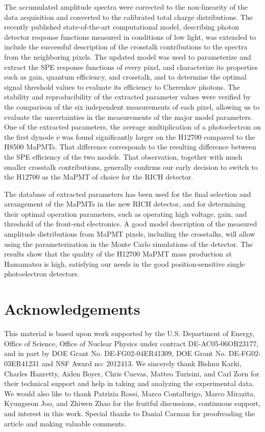 The accumulated amplitude spectra were corrected to the non-linearity of the data acquisition and converted to the calibrated total charge distributions. The recently published state-of-the-art computational model, describing photon detector response functions measured in conditions of low light, was extended to include the successful description of the crosstalk contributions to the spectra from the neighboring pixels. The updated model was used to parameterize and extract the SPE response functions of every pixel, and characterize its properties such as gain, quantum efficiency, and crosstalk, and to determine the optimal signal threshold values to evaluate its efficiency to Cherenkov photons. The stability and reproducibility of the extracted parameter values were verified by the comparison of the six independent measurements of each pixel, allowing us to evaluate the uncertainties in the measurements of the major model parameters. One of the extracted parameters, the average multiplication of a photoelectron on the first dynode $\nu$ was found significantly larger on the H12700 compared to the H8500 MaPMTs. That difference corresponds to the resulting difference between the SPE efficiency of the two models.  That observation, together with much smaller crosstalk contributions, generally confirms our early decision to switch to the H12700 as the MaPMT of choice for the RICH detector.

The database of extracted parameters has been used for the final selection and arrangement of the MaPMTs in the new RICH detector, and for determining their optimal operation parameters, such as operating high voltage, gain, and threshold of the front-end electronics. A good model description of the measured amplitude distributions from MaPMT pixels, including the crosstalks, will allow using the parameterization in the Monte Carlo simulations of the detector. The results show that the quality of the H12700 MaPMT mass production at Hamamatsu is high, satisfying our needs in the good position-sensitive single photoelectron detectors.



\section*{Acknowledgements}
This material is based upon work supported by the U.S. Department of Energy, Office of Science, Office of Nuclear Physics under contract DE-AC05-06OR23177, and in part by DOE Grant No. DE-FG02-04ER41309, DOE Grant No. DE-FG02-03ER41231 and NSF Award no: 2012413. 
We sincerely thank 
Bishnu Karki,
Charles Hanretty,
Aiden Boyer,
Chris  Cuevas,
Matteo Turisini, and
Carl Zorn
for their technical support and help in taking and analyzing the experimental data. We would
also like to thank 
Patrizia Rossi, 
Marco Contalbrigo, 
Marco Mirazita,
Kyungseon Joo,
and Zhiwen Zhao
for the fruitful discussions, continuous support, and interest in this work. Special thanks to Danial Carman for proofreading the article and making valuable comments.